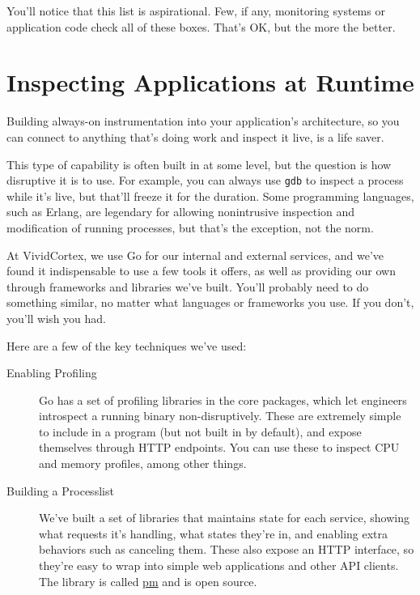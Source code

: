 \documentclass{vivid_layout}
\begin{document}
You'll notice that this list is aspirational. Few, if any, monitoring systems
or application code check all of these boxes. That's OK, but the more the
better.

\section{Inspecting Applications at Runtime}

Building always-on instrumentation into your application's architecture, so you
can connect to anything that's doing work and inspect it live, is a life saver.

This type of capability is often built in at some level, but the question is how
disruptive it is to use. For example, you can always use \texttt{gdb} to inspect
a process while it's live, but that'll freeze it for the duration. Some
programming languages, such as Erlang, are legendary for allowing nonintrusive
inspection and modification of running processes, but that's the exception, not
the norm.

At VividCortex, we use Go for our internal and external services, and we've
found it indispensable to use a few tools it offers, as well as providing our
own through frameworks and libraries we've built. You'll probably need to do
something similar, no matter what languages or frameworks you use. If you don't,
you'll wish you had.

Here are a few of the key techniques we've used:

\begin{description}

\item[Enabling Profiling] Go has a set of profiling libraries in the core
packages, which let engineers introspect a running binary non-disruptively.
These are extremely simple to include in a program (but not built in by
default), and expose themselves through HTTP endpoints. You can use these to
inspect CPU and memory profiles, among other things.

\item[Building a Processlist] We've built a set of libraries that maintains
state for each service, showing what requests it's handling, what states they're
in, and enabling extra behaviors such as canceling them. These also expose an
HTTP interface, so they're easy to wrap into simple web applications and other
API clients.  The library is called \href{https://github.com/VividCortex/pm}{pm}
and is open source.

\end{description}
\end{document}
